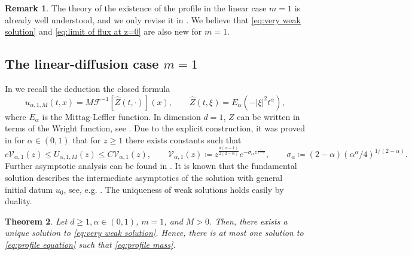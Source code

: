 \documentclass[a4paper]{article}
\newtheorem{theorem}{Theorem}[section]
\theoremstyle{definition}
\newtheorem{remark}[theorem]{Remark}
\begin{document}
\begin{remark}
  The theory of the existence of the profile in the linear case $m = 1$ is already well understood, and we only revise it in .
  We believe that \eqref{eq:very weak solution} and \eqref{eq:limit of flux at z=0} are also new for $m=1$.
\end{remark}

\subsection{The linear-diffusion case $m = 1$}
In  we recall the deduction the closed formula
\begin{equation}
  \label{eq:m=1 self-similar}
  u_{\alpha,1,M}(t,x) = M \mathcal F^{-1}[ \widehat Z(t,\cdot) ] (x), \qquad \widehat Z(t,\xi) = E_\alpha(-|\xi|^2t^\alpha),
\end{equation}
where $E_\alpha$ is the Mittag-Leffler function. In dimension $d=1$, $Z$ can be written in terms of the Wright function, see \cite{MR1829592}.
Due to the explicit construction, it was proved in \cite{dier2020} for $\alpha \in (0,1)$
that for $z \ge 1 $ there exists constants such that
\begin{equation*}
  c \mathcal V_{\alpha,1} (z)
  \le
  {U_{\alpha,1,M}(z)}
  \le C\mathcal V_{\alpha,1}(z),
  \qquad
  \mathcal V_{\alpha,1}(z) \coloneqq z^{\frac{d(\alpha-1)}{2(2-\alpha)}} e^{-\sigma_\alpha z^{\frac 1{2-\alpha}}},
  \qquad
  \sigma_\alpha \coloneqq (2-\alpha)(\alpha^\alpha/4)^{1/(2-\alpha)}.
\end{equation*}
Further asymptotic analysis can be found in \cite{deng2019}.
It is known that the fundamental solution describes the intermediate asymptotics of the solution with general initial datum $u_0$, see, e.g. \cite{cortazarHeatEquationMemory2021}. The uniqueness of weak solutions holds easily by duality.
\begin{theorem}
  \label{thm:m=1 uniqueness}
  Let $d \ge 1, \alpha \in (0,1)$, $m = 1$, and $M > 0$. Then, there exists a unique solution to \eqref{eq:very weak solution}.
  Hence, there is at most one solution to \eqref{eq:profile equation} such that \eqref{eq:profile mass}.
\end{theorem}
\end{document}
